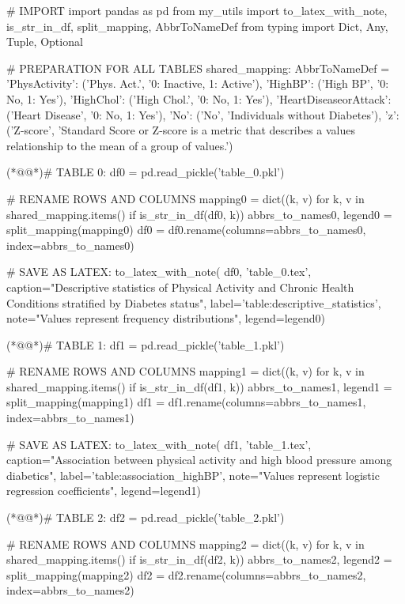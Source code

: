 \documentclass[11pt]{article}
\begin{document}
\begin{python}


# IMPORT
import pandas as pd
from my_utils import to_latex_with_note, is_str_in_df, split_mapping, AbbrToNameDef
from typing import Dict, Any, Tuple, Optional

# PREPARATION FOR ALL TABLES
shared_mapping: AbbrToNameDef = {
    'PhysActivity': ('Phys. Act.', '0: Inactive, 1: Active'),
    'HighBP': ('High BP', '0: No, 1: Yes'),
    'HighChol': ('High Chol.', '0: No, 1: Yes'),
    'HeartDiseaseorAttack': ('Heart Disease', '0: No, 1: Yes'),
    'No': ('No', 'Individuals without Diabetes'),
    'z': ('Z-score', 'Standard Score or Z-score is a metric that describes a values relationship to the mean of a group of values.')
}

(*@@*)# TABLE 0:
df0 = pd.read_pickle('table_0.pkl')

# RENAME ROWS AND COLUMNS 
mapping0 = dict((k, v) for k, v in shared_mapping.items() if is_str_in_df(df0, k)) 
abbrs_to_names0, legend0 = split_mapping(mapping0)
df0 = df0.rename(columns=abbrs_to_names0, index=abbrs_to_names0)

# SAVE AS LATEX:
to_latex_with_note(
    df0, 'table_0.tex',
    caption="Descriptive statistics of Physical Activity and Chronic Health Conditions stratified by Diabetes status", 
    label='table:descriptive_statistics',
    note="Values represent frequency distributions",
    legend=legend0)

(*@@*)# TABLE 1:
df1 = pd.read_pickle('table_1.pkl')

# RENAME ROWS AND COLUMNS 
mapping1 = dict((k, v) for k, v in shared_mapping.items() if is_str_in_df(df1, k)) 
abbrs_to_names1, legend1 = split_mapping(mapping1)
df1 = df1.rename(columns=abbrs_to_names1, index=abbrs_to_names1)

# SAVE AS LATEX:
to_latex_with_note(
    df1, 'table_1.tex',
    caption="Association between physical activity and high blood pressure among diabetics", 
    label='table:association_highBP',
    note="Values represent logistic regression coefficients",
    legend=legend1)

(*@@*)# TABLE 2:
df2 = pd.read_pickle('table_2.pkl')

# RENAME ROWS AND COLUMNS 
mapping2 = dict((k, v) for k, v in shared_mapping.items() if is_str_in_df(df2, k)) 
abbrs_to_names2, legend2 = split_mapping(mapping2)
df2 = df2.rename(columns=abbrs_to_names2, index=abbrs_to_names2)


\end{python}
\end{document}
